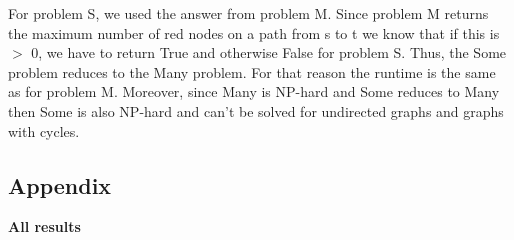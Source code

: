 \documentclass[a4paper]{article}
\begin{document}
For problem S, we used the answer from problem M. Since problem M returns the maximum number of red nodes on a path from s to t we know that if this is $>$ 0, we have
to return True and otherwise False for problem S. Thus, the Some problem reduces to the Many problem.
For that reason the runtime is the same as for problem M. Moreover, since Many is NP-hard and Some reduces to Many then Some is also NP-hard and can't be solved for
undirected graphs and graphs with cycles.

\subsection{Appendix}
\textbf{All results}

\end{document}
